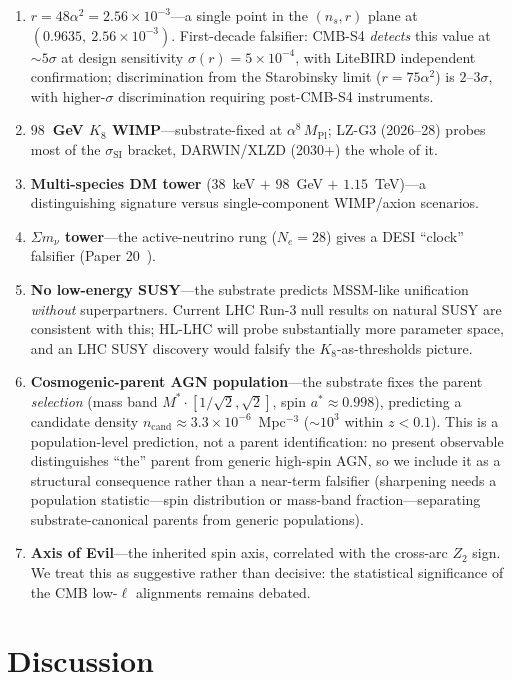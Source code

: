\documentclass[11pt]{article}
\newcommand{\Mpl}{M_{\mathrm{Pl}}}
\begin{document}
\begin{enumerate}
\item \textbf{$r = 48\alpha^2 = 2.56\times10^{-3}$}---a single point in the $(n_s, r)$ plane at $(0.9635,\ 2.56\times10^{-3})$.  First-decade falsifier: CMB-S4 \emph{detects} this value at $\sim\!5\sigma$ at design sensitivity $\sigma(r) = 5\times10^{-4}$, with LiteBIRD independent confirmation; discrimination from the Starobinsky limit ($r = 75\alpha^2$) is $2$--$3\sigma$, with higher-$\sigma$ discrimination requiring post-CMB-S4 instruments.
\item \textbf{$98$~GeV $K_8$ WIMP}---substrate-fixed at $\alpha^8\,\Mpl$; LZ-G3 (2026--28) probes most of the $\sigma_{\mathrm{SI}}$ bracket, DARWIN/XLZD (2030+) the whole of it.
\item \textbf{Multi-species DM tower} ($38$~keV $+$ $98$~GeV $+$ $1.15$~TeV)---a distinguishing signature versus single-component WIMP/axion scenarios.
\item \textbf{$\Sigma m_\nu$ tower}---the active-neutrino rung ($N_e = 28$) gives a DESI ``clock'' falsifier (Paper 20~\cite{Paper20}).
\item \textbf{No low-energy SUSY}---the substrate predicts MSSM-like unification \emph{without} superpartners. Current LHC Run-3 null results on natural SUSY are consistent with this; HL-LHC will probe substantially more parameter space, and an LHC SUSY discovery would falsify the $K_8$-as-thresholds picture.
\item \textbf{Cosmogenic-parent AGN population}---the substrate fixes the parent \emph{selection} (mass band $M^*\!\cdot[1/\sqrt{2}, \sqrt{2}]$, spin $a^* \approx 0.998$), predicting a candidate density $n_{\mathrm{cand}} \approx 3.3\times10^{-6}$~Mpc$^{-3}$ ($\sim\!10^3$ within $z < 0.1$). This is a population-level prediction, not a parent identification: no present observable distinguishes ``the'' parent from generic high-spin AGN, so we include it as a structural consequence rather than a near-term falsifier (sharpening needs a population statistic---spin distribution or mass-band fraction---separating substrate-canonical parents from generic populations).
\item \textbf{Axis of Evil}---the inherited spin axis, correlated with the cross-arc $Z_2$ sign.  We treat this as suggestive rather than decisive: the statistical significance of the CMB low-$\ell$ alignments remains debated.
\end{enumerate}

\section{Discussion}
\label{sec:discussion}
\end{document}
